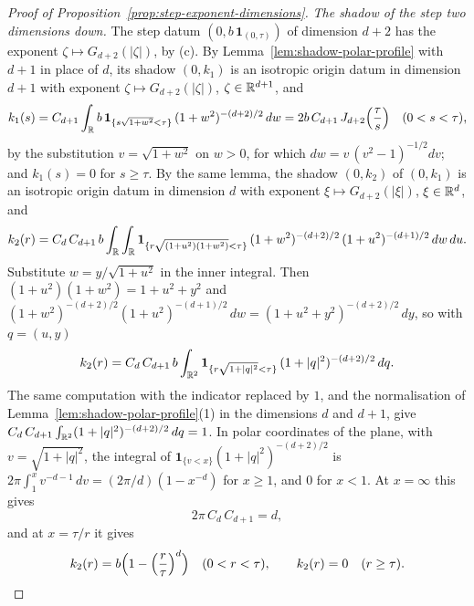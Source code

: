 \begin{proof}[Proof of Proposition~\ref{prop:step-exponent-dimensions}]
\emph{The shadow of the step two dimensions down.} The step datum
$(0, b\,\mathbf 1_{(0,\tau)})$ of dimension $d + 2$ has the exponent
$\zeta \mapsto G_{d+2}(|\zeta|)$, by (c). By Lemma~\ref{lem:shadow-polar-profile} with $d + 1$ in place
of $d$, its shadow $(0,k_1)$ is an isotropic origin datum in dimension $d + 1$ with exponent
$\zeta \mapsto G_{d+2}(|\zeta|)$, $\zeta \in \mathbb{R}^{d+1}$, and
\[
  k_1(s) = C_{d+1}\int_{\mathbb{R}} b\,\mathbf 1_{\{s\sqrt{1+w^2} < \tau\}}\,(1+w^2)^{-(d+2)/2}\,dw
         = 2b\,C_{d+1}\,J_{d+2}\Bigl(\frac{\tau}{s}\Bigr) \quad (0 < s < \tau),
\]
by the substitution $v = \sqrt{1+w^2}$ on $w > 0$, for which $dw = v\,(v^2-1)^{-1/2}dv$; and
$k_1(s) = 0$ for $s \ge \tau$. By the same lemma, the shadow $(0,k_2)$ of $(0,k_1)$ is an
isotropic origin datum in dimension $d$ with exponent $\xi \mapsto G_{d+2}(|\xi|)$,
$\xi \in \mathbb{R}^d$, and
\[
  k_2(r) = C_d\,C_{d+1}\,b\int_{\mathbb{R}}\int_{\mathbb{R}}
     \mathbf 1_{\{r\sqrt{(1+u^2)(1+w^2)} < \tau\}}\,(1+w^2)^{-(d+2)/2}\,(1+u^2)^{-(d+1)/2}\,dw\,du .
\]
Substitute $w = y/\sqrt{1+u^2}$ in the inner integral. Then $(1+u^2)(1+w^2) = 1 + u^2 + y^2$ and
$(1+w^2)^{-(d+2)/2}(1+u^2)^{-(d+1)/2}\,dw = (1+u^2+y^2)^{-(d+2)/2}\,dy$, so with $q = (u,y)$
\[
  k_2(r) = C_d\,C_{d+1}\,b\int_{\mathbb{R}^2}\mathbf 1_{\{r\sqrt{1+|q|^2} < \tau\}}\,
     (1+|q|^2)^{-(d+2)/2}\,dq .
\]
The same computation with the indicator replaced by $1$, and the normalisation of
Lemma~\ref{lem:shadow-polar-profile}(1) in the dimensions $d$ and $d + 1$, give
$C_d\,C_{d+1}\int_{\mathbb{R}^2}(1+|q|^2)^{-(d+2)/2}\,dq = 1$. In polar coordinates of the plane, with
$v = \sqrt{1+|q|^2}$, the integral of $\mathbf 1_{\{v < x\}}(1+|q|^2)^{-(d+2)/2}$ is
$2\pi\int_1^x v^{-d-1}\,dv = (2\pi/d)(1 - x^{-d})$ for $x \ge 1$, and $0$ for $x < 1$. At
$x = \infty$ this gives
\begin{equation}\label{eq:shadow-constants}
  2\pi\,C_d\,C_{d+1} = d ,
\end{equation}
and at $x = \tau/r$ it gives
\[
  k_2(r) = b\Bigl(1 - \Bigl(\frac{r}{\tau}\Bigr)^{d}\Bigr) \quad (0 < r < \tau), \qquad
  k_2(r) = 0 \quad (r \ge \tau) .
\]


\end{proof}
